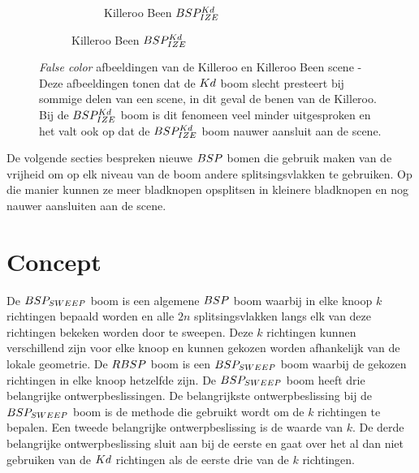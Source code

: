 \begin{figure}
\begin{subfigure}{0.5\textwidth}
\begin{subfigure}{\textwidth}
            \caption{Killeroo Been $BSP^{Kd}_{IZE}$}
            \label{fig:killeroo-been-bspize-heatmap}    
        \end{subfigure}
    \end{subfigure}
    \caption[\textit{False color} afbeeldingen van de Killeroo en Killeroo Been scene]{\textit{False color} afbeeldingen van de Killeroo en Killeroo Been scene - \small Deze afbeeldingen tonen dat de $Kd$ boom slecht presteert bij sommige delen van een scene, in dit geval de benen van de Killeroo. Bij de $BSP^{Kd}_{IZE}$ boom is dit fenomeen veel minder uitgesproken en het valt ook op dat de $BSP^{Kd}_{IZE}$ boom nauwer aansluit aan de scene.}
    \label{fig:killeroo-heatmaps}
\end{figure}

De volgende secties bespreken nieuwe $BSP$ bomen die gebruik maken van de vrijheid om op elk niveau van de boom andere splitsingsvlakken te gebruiken. Op die manier kunnen ze meer bladknopen opsplitsen in kleinere bladknopen en nog nauwer aansluiten aan de scene.\\



\section{Concept}
    De $BSP_{SWEEP}$ boom is een algemene $BSP$ boom waarbij in elke knoop $k$ richtingen bepaald worden en alle $2n$ splitsingsvlakken langs elk van deze richtingen bekeken worden door te sweepen.
    Deze $k$ richtingen kunnen verschillend zijn voor elke knoop en kunnen gekozen worden afhankelijk van de lokale geometrie.
    De $RBSP$ boom is een $BSP_{SWEEP}$ boom waarbij de gekozen richtingen in elke knoop hetzelfde zijn.
    De $BSP_{SWEEP}$ boom heeft drie belangrijke ontwerpbeslissingen.
    De belangrijkste ontwerpbeslissing bij de $BSP_{SWEEP}$ boom is de methode die gebruikt wordt om de $k$ richtingen te bepalen.
    Een tweede belangrijke ontwerpbeslissing is de waarde van $k$.
    De derde belangrijke ontwerpbeslissing sluit aan bij de eerste en gaat over het al dan niet gebruiken van de $Kd$ richtingen als de eerste drie van de $k$ richtingen.
    \\


